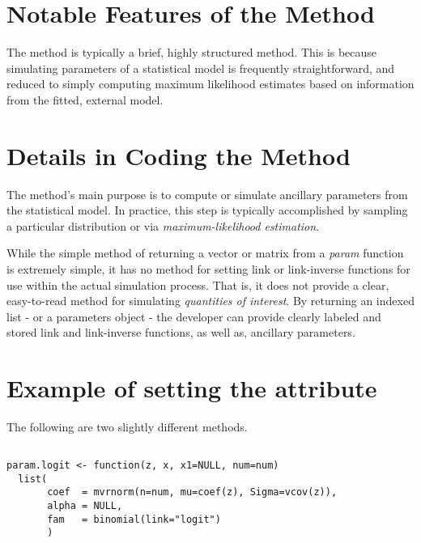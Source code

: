 \section{Notable Features of the  Method}

The  method is typically a brief, highly structured method. This is because simulating parameters of a statistical model is frequently straightforward, and reduced to simply computing maximum likelihood estimates based on information from the fitted, external model.


\section{Details in Coding the  Method}

The  method's main purpose is to compute or simulate ancillary parameters from the statistical model.  In practice, this step is typically accomplished by sampling a particular distribution or via \emph{maximum-likelihood estimation}.

While the simple method of returning a vector or matrix from a \emph{param} function is extremely simple, it has no method for setting link or link-inverse functions for use within the actual simulation process.  That is, it does not provide a clear, easy-to-read method for simulating \emph{quantities of interest}.  By returning an indexed list - or a parameters object - the developer can provide clearly labeled and stored link and link-inverse functions, as well as, ancillary parameters.

\section{Example of setting the  attribute}

The following are two slightly different  methods.

\subsection{}

\begin{verbatim}
param.logit <- function(z, x, x1=NULL, num=num)
  list(
       coef  = mvrnorm(n=num, mu=coef(z), Sigma=vcov(z)),
       alpha = NULL,
       fam   = binomial(link="logit")
       )
\end{verbatim}

